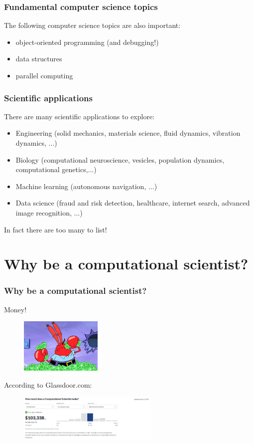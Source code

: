 \documentclass{if-beamer}
\begin{document}
\begin{frame}
\frametitle{Fundamental computer science topics}
The following computer science topics are also important: \\
\begin{itemize}
	\item object-oriented programming (and debugging!)
	\item data structures
	\item parallel computing
\end{itemize}
\end{frame}

\begin{frame}
\frametitle{Scientific applications}
There are many scientific applications to explore: \\
\begin{itemize}
\item Engineering (solid mechanics, materials science, fluid
dynamics, vibration dynamics, ...)
\item Biology (computational neuroscience, vesicles, population dynamics, computational genetics,...)
\item Machine learning (autonomous navigation, ...)
\item Data science (fraud and risk detection, healthcare, internet
search, advanced image recognition, ...)
\end{itemize}
In fact there are too many to list!
\end{frame}

\section{Why be a computational scientist?}

\begin{frame}
\frametitle{Why be a computational scientist?}
Money!
\begin{figure}
	\center
	\includegraphics[width=0.35\textwidth]{money.jpg}
\end{figure}
According to Glassdoor.com:
\begin{figure}
	\center
	\includegraphics[width=0.6\textwidth]{glassdoor.png}
\end{figure}
\end{frame}

\end{document}
